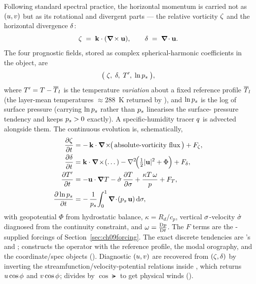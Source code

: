 Following standard spectral practice, the horizontal momentum is carried not as
$(u,v)$ but as its rotational and divergent parts --- the relative vorticity
$\zeta$ and the horizontal divergence $\delta$:
\begin{equation}
  \zeta \;=\; \mathbf{k}\cdot(\boldsymbol{\nabla}\!\times\!\,\mathbf{u}), \qquad
  \delta  \;=\; \boldsymbol{\nabla}\!\cdot\!\,\mathbf{u} .
\end{equation}
The four prognostic fields, stored as complex spherical-harmonic coefficients in
the \dino{}  object, are
\begin{equation}
  \big(\;\zeta,\;\delta,\;T',\;\ln p_s\;\big),
\end{equation}
where $T' = T - \overline{T}_l$ is the temperature \emph{variation} about a fixed
reference profile $\overline{T}_l$ (the layer-mean temperatures $\approx 288$~K returned
by ), and $\ln p_s$ is the log of surface
pressure (carrying $\ln p_s$ rather than $p_s$ linearises the surface-
pressure tendency and keeps $p_s>0$ exactly). A specific-humidity tracer
$q$ is advected alongside them. The continuous evolution is, schematically,
\begin{align}
  \pd{\vort}{t} &= -\,\kvec\cdot\curl\!\big(\,\text{absolute-vorticity flux}\,\big)
                   + F_\vort, \\
  \pd{\dvg}{t}  &= \kvec\cdot\curl(\dots) - \lap\!\Big(\tfrac{1}{2}|\uvec|^2 + \Phi\Big)
                   + F_\dvg, \\
  \pd{\Tvar}{t} &= -\uvec\cdot\grad T - \sigd\,\pd{T}{\sig}
                   + \frac{\kappa T\,\omega}{\pres} + F_T, \\
  \pd{\ln\pres_s}{t} &= -\,\frac{1}{\pres_s}\!\int_0^1 \diver(\pres_s\,\uvec)\dd\sig ,
  \label{eq:lnps}
\end{align}
with geopotential $\Phi$ from hydrostatic balance, $\kappa = R_d/c_p$, vertical
$\sigma$-velocity $\dot{\sigma}$ diagnosed from the continuity constraint, and
$\omega = \frac{\mathrm{D}p}{\mathrm{D}t}$. The $F$ terms are the \model{}-supplied forcings of
Section~\ref{sec:ch09forcing}. The exact discrete tendencies are \dino{}'s
 and ; \model{}
constructs the operator with the reference profile, the modal orography, and the
coordinate/spec objects ().
Diagnostic $(u,v)$ are recovered from $(\zeta,\delta)$ by inverting the
streamfunction/velocity-potential relations inside
, which returns $u\cos\phi$ and $v\cos\phi$;
\model{} divides by $\cos\lat$ to get physical winds
().

